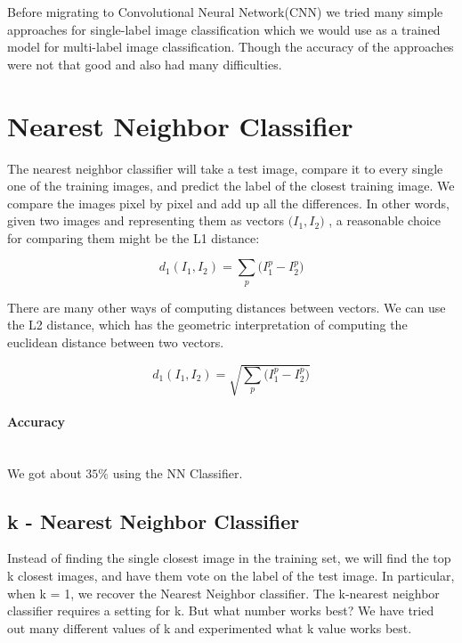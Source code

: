 Before migrating to Convolutional Neural Network(CNN) we tried many simple approaches for single-label image classification which we would use as a trained model for multi-label image classification. Though the accuracy of the approaches were not that good and also had many difficulties.

\section{Nearest Neighbor Classifier} 

The nearest neighbor classifier will take a test image, compare it to every single one of the training images, and predict the label of the closest training image. We compare the images pixel by pixel and add up all the differences. In other words, given two images and representing them as vectors $\big(I_{1},I_{2}\big)$ , a reasonable choice for comparing them might be the L1 distance:

\begin{equation}
 d_{1}(I_{1},I_{2}) =\sum_{p} \big(I_{1}^p-I_{2}^p\big)
\end{equation}

There are many other ways of computing distances between vectors. We can use the L2 distance, which has the geometric interpretation of computing the euclidean distance between two vectors.


\begin{equation}
 d_{1}(I_{1},I_{2}) = \sqrt{\sum_{p} \big(I_{1}^p-I_{2}^p\big)}
 \end{equation}
 
\paragraph{Accuracy}
\leavevmode \\
We got about $35\%$ using the NN Classifier.



\subsection{k - Nearest Neighbor Classifier}
Instead of finding the single closest image in the training set, we will find the top k closest images, and have them vote on the label of the test image. In particular, when k = 1, we recover the Nearest Neighbor classifier. The k-nearest neighbor classifier requires a setting for k. But what number works best? We have tried out many different values of k and experimented what k value works best.

